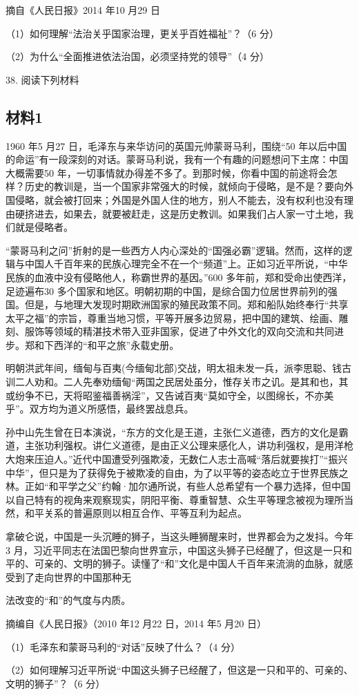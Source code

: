 \documentclass[UTF8,11pt]{ctexart}
\begin{document}
摘自《人民日报》2014 年10 月29 日


（1）如何理解“法治关乎国家治理，更关乎百姓福祉”？（6 分）


（2）为什么“全面推进依法治国，必须坚持党的领导”（4 分）


38. 阅读下列材料


\subsection*{材料1}

1960 年5 月27 日，毛泽东与来华访问的英国元帅蒙哥马利，围绕“50 年以后中国的命运”有一段深刻的对话。蒙哥马利说，我有一个有趣的问题想问下主席：中国大概需要50 年，一切事情就办得差不多了。到那时候，你看中国的前途将会怎样？历史的教训是，当一个国家非常强大的时候，就倾向于侵略，是不是？要向外国侵略，就会被打回来；外国是外国人住的地方，别人不能去，没有权利也没有理由硬挤进去，如果去，就要被赶走，这是历史教训。如果我们占人家一寸土地，我们就是侵略者。

“蒙哥马利之问”折射的是一些西方人内心深处的“国强必霸”逻辑。然而，这样的逻辑与中国人千百年来的民族心理完全不在一个“频道”上。正如习近平所说，“中华民族的血液中没有侵略他人，称霸世界的基因。”600 多年前，郑和受命出使西洋，足迹遍布30 多个国家和地区。明朝初期的中国，是综合国力位居世界前列的强国。但是，与地理大发现时期欧洲国家的殖民政策不同。郑和船队始终奉行“共享太平之福”的宗旨，尊重当地习惯，平等开展多边贸易，把中国的建筑、绘画、雕刻、服饰等领域的精湛技术带入亚非国家，促进了中外文化的双向交流和共同进步。郑和下西洋的“和平之旅”永载史册。

明朝洪武年间，缅甸与百夷(今缅甸北部)交战，明太祖未发一兵，派李思聪、钱古训二人劝和。二人先奉劝缅甸“两国之民居处虽分，惟存关市之讥。是其和也，其或纷争不已，天将昭鉴福善祸淫”，又告诫百夷“莫如守全，以图绵长，不亦美乎”。双方均为道义所感悟，最终罢战息兵。

孙中山先生曾在日本演说，“东方的文化是王道，主张仁义道德，西方的文化是霸道，主张功利强权。讲仁义道德，是由正义公理来感化人，讲功利强权，是用洋枪大炮来压迫人。”近代中国遭受列强欺凌，无数仁人志士高喊“落后就要挨打”“振兴中华”，但只是为了获得免于被欺凌的自由，为了以平等的姿态屹立于世界民族之林。正如“和平学之父”约翰·加尔通所说，有些人总希望有一个暴力选择，但中国以自己特有的视角来观察现实，阴阳平衡、尊重智慧、众生平等理念被视为理所当然，和平关系的普遍原则以相互合作、平等互利为起点。

拿破仑说，中国是一头沉睡的狮子，当这头睡狮醒来时，世界都会为之发抖。今年3 月，习近平同志在法国巴黎向世界宣示，中国这头狮子已经醒了，但这是一只和平的、可亲的、文明的狮子。读懂了“和”文化是中国人千百年来流淌的血脉，就感受到了走向世界的中国那种无

法改变的“和”的气度与内质。

摘编自《人民日报》（2010 年12 月22 日，2014 年5 月20 日）

（1）毛泽东和蒙哥马利的“对话”反映了什么？（4 分）


（2）如何理解习近平所说“中国这头狮子已经醒了，但这是一只和平的、可亲的、文明的狮子”？（6 分）
\end{document}
